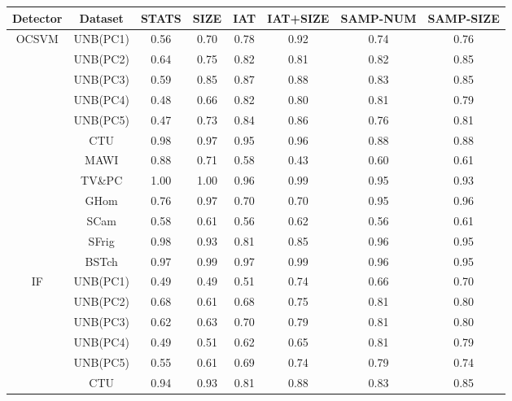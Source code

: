 \documentclass{article}
\begin{document}
\begin{tiny}
\begin{longtable}{|c|c|c|c|c|c|c|c|}
\toprule
 Detector & Dataset & STATS & SIZE & IAT & IAT+SIZE & SAMP-NUM & SAMP-SIZE  \\ 
\midrule
\multirow{7}{*}{OCSVM} &UNB(PC1) & 0.56 & 0.70 & 0.78 & 0.92 & 0.74 & 0.76  \\ 
&UNB(PC2) & 0.64 & 0.75 & 0.82 & 0.81 & 0.82 & 0.85  \\ 
&UNB(PC3) & 0.59 & 0.85 & 0.87 & 0.88 & 0.83 & 0.85 \\ 
&UNB(PC4) & 0.48 & 0.66 & 0.82 & 0.80 & 0.81 & 0.79 \\ 
&UNB(PC5) & 0.47 & 0.73 & 0.84 & 0.86 & 0.76 & 0.81 \\ 
\cmidrule{2-8}
&CTU & 0.98 & 0.97 & 0.95 & 0.96 & 0.88 & 0.88\\ 
\cmidrule{2-8}
&MAWI & 0.88 & 0.71 & 0.58 & 0.43 & 0.60 & 0.61\\ 
\cmidrule{2-8}
&TV\&PC & 1.00 & 1.00 & 0.96 & 0.99 & 0.95 & 0.93\\ 
\cmidrule{2-8}
&GHom & 0.76 & 0.97 & 0.70 & 0.70 & 0.95 & 0.96\\ 
&SCam & 0.58 & 0.61 & 0.56 & 0.62 & 0.56 & 0.61\\ 
&SFrig & 0.98 & 0.93 & 0.81 & 0.85 & 0.96 & 0.95 \\ 
&BSTch & 0.97 & 0.99 & 0.97 & 0.99 & 0.96 & 0.95  \\ 
\midrule
\multirow{7}{*}{IF} &UNB(PC1) & 0.49 & 0.49 & 0.51 & 0.74 & 0.66 & 0.70  \\ 
&UNB(PC2) & 0.68 & 0.61 & 0.68 & 0.75 & 0.81 & 0.80  \\ 
&UNB(PC3) & 0.62 & 0.63 & 0.70 & 0.79 & 0.81 & 0.80 \\ 
&UNB(PC4) & 0.49 & 0.51 & 0.62 & 0.65 & 0.81 & 0.79 \\ 
&UNB(PC5) & 0.55 & 0.61 & 0.69 & 0.74 & 0.79 & 0.74 \\ 
\cmidrule{2-8}
&CTU & 0.94 & 0.93 & 0.81 & 0.88 & 0.83 & 0.85\\ 
\cmidrule{2-8}

\end{longtable}
\end{tiny}
\end{document}
